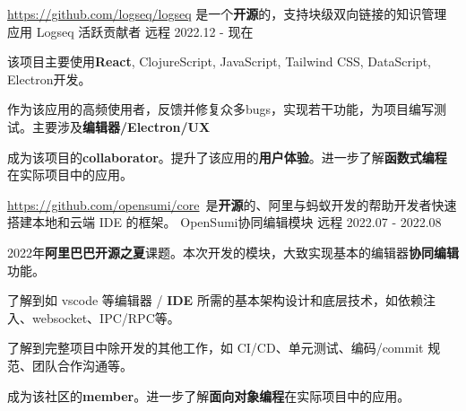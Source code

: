 

\begin{cventries}


    \cventry
    {\href{https://github.com/logseq/logseq}{https://github.com/logseq/logseq} 是一个\textbf{开源}的，支持块级双向链接的知识管理应用} %
    {Logseq 活跃贡献者} %
    {远程} %
    {2022.12 - 现在} %
    {
        \begin{cvitems} %
            \item {该项目主要使用\textbf{React}, ClojureScript, JavaScript, Tailwind CSS, DataScript, Electron开发。}
            \item {作为该应用的高频使用者，反馈并修复众多bugs，实现若干功能，为项目编写测试。主要涉及\textbf{编辑器/Electron/UX}}
            \item {成为该项目的\textbf{collaborator}。提升了该应用的\textbf{用户体验}。进一步了解\textbf{函数式编程}在实际项目中的应用。}
        \end{cvitems}
    }


    \cventry
    {\href{https://github.com/opensumi/core}{https://github.com/opensumi/core}\ 是\textbf{开源}的、阿里与蚂蚁开发的帮助开发者快速搭建本地和云端 IDE 的框架。} %
    {OpenSumi协同编辑模块} %
    {远程} %
    {2022.07 - 2022.08} %
    {
        \begin{cvitems} %
            \item {2022年\textbf{阿里巴巴开源之夏}课题。本次开发的模块，大致实现基本的编辑器\textbf{协同编辑}功能。}
            \item {了解到如 vscode 等编辑器 / \textbf{IDE} 所需的基本架构设计和底层技术，如依赖注入、websocket、IPC/RPC等。}
            \item {了解到完整项目中除开发的其他工作，如 CI/CD、单元测试、编码/commit 规范、团队合作沟通等。}
            \item {成为该社区的\textbf{member}。进一步了解\textbf{面向对象编程}在实际项目中的应用。}
        \end{cvitems}
    }


\end{cventries}
